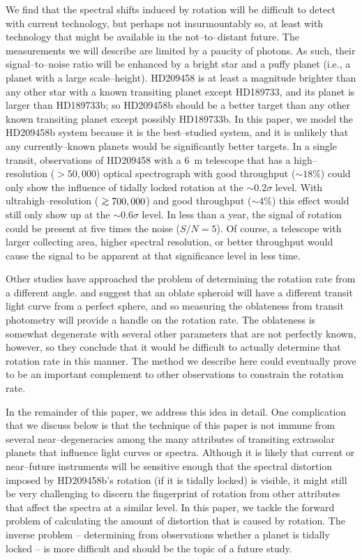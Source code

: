 \documentclass[12pt,preprint]{aastex}
\def\gsim{\;\rlap{\lower 2.5pt
 \hbox{$\sim$}}\raise 1.5pt\hbox{$>$}\;}
\begin{document}
We find that the spectral shifts induced by rotation will be difficult to
detect with current technology, but perhaps not insurmountably so, at least
with technology that might be available in the not--to--distant future.
The measurements we will describe are limited by a paucity of photons.
As such, their signal--to--noise ratio will be enhanced by a bright star and
a puffy planet (i.e., a planet with a large scale--height).  HD209458 is
at least a magnitude brighter than any other star with a known transiting
planet except HD189733, and its planet is larger than HD189733b; so HD209458b
should be a better target than any other known transiting planet except
possibly HD189733b.  In this paper, we model the HD209458b system because it is
the best--studied system, and it is unlikely that any currently--known
planets would be significantly better targets.
In a single transit, observations of HD209458 with a 6~m
telescope that has a high--resolution ($>50,000$) optical spectrograph
with good throughput ($\sim 18\%$) could only show the influence of tidally
locked rotation at the $\sim 0.2\sigma$ level.  With ultrahigh--resolution
($\gsim 700,000$) and good throughput ($\sim 4\%$) this effect would still
only show up at the $\sim 0.6 \sigma$ level.  In less than a year, the signal
of rotation could be present at five times the noise ($S/N = 5$).  Of
course, a telescope with larger collecting area, higher spectral
resolution, or better throughput would cause the signal to be apparent
at that significance level in less time.

Other studies have approached the problem of determining the rotation
rate from a different angle.  \citet{seager+hui2002} and
\citet{barnes+fortney2003} suggest that an oblate spheroid will have a
different transit light curve from a perfect sphere, and so measuring
the oblateness from transit photometry will provide a handle on the
rotation rate.  The oblateness is somewhat degenerate with several
other parameters that are not perfectly known, however, so they
conclude that it would be difficult to actually determine that
rotation rate in this manner.  The method we describe here could
eventually prove to be an important complement to other observations
to constrain the rotation rate.

In the remainder of this paper, we address this idea in detail.
One complication that we discuss below is that the technique of this paper
is not immune from several near--degeneracies among the many
attributes of transiting extrasolar planets that influence light
curves or spectra.  Although it is likely that current or near--future
instruments will be sensitive enough that the spectral distortion
imposed by HD209458b's rotation (if it is tidally locked) is
visible, it might still be very challenging to discern the fingerprint
of rotation from other attributes that affect the spectra at a similar
level.  In this paper, we tackle the forward problem of calculating the
amount of distortion that is caused by rotation.  The inverse
problem -- determining from observations whether a planet is tidally
locked -- is more difficult and should be the topic of a future study.
\end{document}
